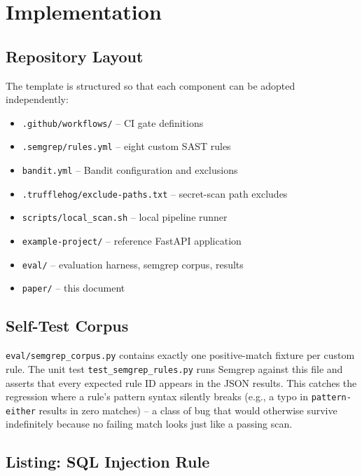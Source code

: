 \documentclass[conference]{IEEEtran}
\begin{document}
\section{Implementation}
\label{sec:impl}

\subsection{Repository Layout}

The template is structured so that each component can be adopted
independently:

\begin{itemize}
  \item \texttt{.github/workflows/} -- CI gate definitions
  \item \texttt{.semgrep/rules.yml} -- eight custom SAST rules
  \item \texttt{bandit.yml} -- Bandit configuration and exclusions
  \item \texttt{.trufflehog/exclude-paths.txt} -- secret-scan path excludes
  \item \texttt{scripts/local\_scan.sh} -- local pipeline runner
  \item \texttt{example-project/} -- reference FastAPI application
  \item \texttt{eval/} -- evaluation harness, semgrep corpus, results
  \item \texttt{paper/} -- this document
\end{itemize}

\subsection{Self-Test Corpus}

\texttt{eval/semgrep\_corpus.py} contains exactly one positive-match
fixture per custom rule. The unit test \texttt{test\_semgrep\_rules.py}
runs Semgrep against this file and asserts that every expected rule ID
appears in the JSON results. This catches the regression where a rule's
pattern syntax silently breaks (e.g., a typo in \texttt{pattern-either}
results in zero matches) -- a class of bug that would otherwise survive
indefinitely because no failing match looks just like a passing scan.

\subsection{Listing: SQL Injection Rule}
\end{document}
